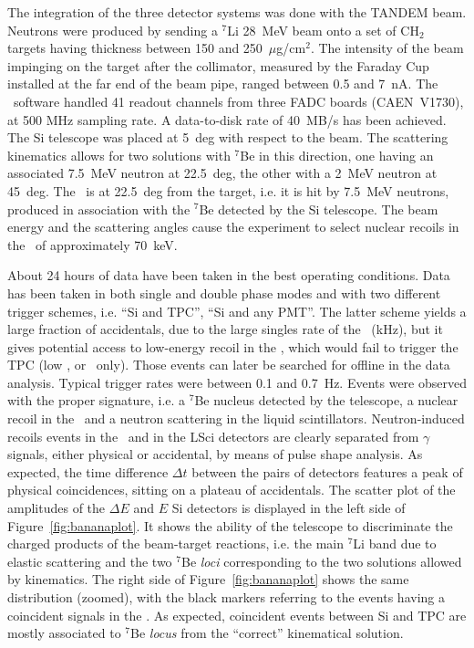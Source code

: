 The integration of the three detector systems was done with the TANDEM beam.  Neutrons were produced by sending a $^{7}$Li 28~MeV beam onto a set of CH$_2$ targets having thickness between 150 and 250~$\mu$g/cm$^2$. The intensity of the beam impinging on the target after the collimator, measured by the Faraday Cup installed at the far end of the beam pipe, ranged between 0.5 and 7~nA. The \DAQ\ software handled 41 readout channels from three FADC boards (CAEN~V1730), at 500 MHz sampling rate. A data-to-disk rate of 40~MB/s has been achieved. The Si telescope was placed at 5~deg with respect to the beam. The scattering kinematics allows for two solutions with $^{7}$Be in this direction, one having an associated 7.5~MeV neutron at 22.5~deg, the other with a 2~MeV neutron at 45~deg. The \LArTPC\ is at 22.5~deg from the target, i.e. it is hit by 7.5~MeV neutrons, produced in association with the $^{7}$Be detected by the Si telescope. The beam energy and the scattering angles cause the experiment to select nuclear recoils in the \TPC\ of approximately 70~keV.
 
About 24 hours of data have been taken in the best operating conditions.  Data has been taken in both single and double phase modes and with two different trigger schemes, i.e. ``Si and TPC'', ``Si and any PMT''. The latter scheme yields a large fraction of accidentals, due to the large singles rate of the \PMTs\ (kHz), but it gives potential access to low-energy recoil in the \TPC, which would fail to trigger the TPC (low \SOne, or \STwo\ only).  Those events can later be searched for offline in the data analysis. Typical trigger rates were between 0.1 and 0.7~Hz. Events were observed with the proper signature, i.e. a $^{7}$Be nucleus detected by the telescope, a nuclear recoil in the \LArTPC\ and a neutron scattering in the liquid scintillators. Neutron-induced recoils events in the \TPC\ and in the LSci detectors are clearly separated from $\gamma$ signals, either physical or accidental, by means of pulse shape analysis. As expected, the time difference $\Delta t$ between the pairs of detectors features a peak of physical coincidences, sitting on a plateau of accidentals. The scatter plot of the amplitudes of the $\Delta E$ and $E$ Si detectors is displayed in the left side of Figure~\ref{fig:bananaplot}.  It shows the ability of the telescope to discriminate the charged products of the beam-target reactions, i.e. the main $^{7}$Li band due to elastic scattering and the two $^{7}$Be \emph{loci} corresponding to the two solutions allowed by kinematics. The right side of Figure~\ref{fig:bananaplot} shows the same distribution (zoomed), with the black markers referring to the events having a coincident signals in the \TPC. As expected, coincident events between Si and TPC are mostly associated to $^{7}$Be \emph{locus} from the ``correct'' kinematical solution.

